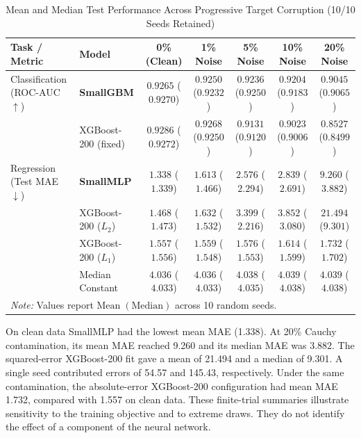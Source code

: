 \documentclass[journal]{IEEEtran}
\begin{document}
\begin{table}[!t]
\centering
\caption{Mean and Median Test Performance Across Progressive Target Corruption (10/10 Seeds Retained)}
\label{tab:noise_sweep}
\footnotesize
\begin{tabular}{llccccc}
\toprule
\textbf{Task / Metric} & \textbf{Model} & \textbf{0\% (Clean)} & \textbf{1\% Noise} & \textbf{5\% Noise} & \textbf{10\% Noise} & \textbf{20\% Noise} \\
\midrule
Classification (ROC-AUC $\uparrow$) & \textbf{SmallGBM} & $0.9265$ ($0.9270$) & $0.9250$ ($0.9232$) & $\mathbf{0.9236}$ ($\mathbf{0.9250}$) & $\mathbf{0.9204}$ ($\mathbf{0.9183}$) & $\mathbf{0.9045}$ ($\mathbf{0.9065}$) \\
 & XGBoost-200 (fixed) & $\mathbf{0.9286}$ ($\mathbf{0.9272}$) & $\mathbf{0.9268}$ ($\mathbf{0.9250}$) & $0.9131$ ($0.9120$) & $0.9023$ ($0.9006$) & $0.8527$ ($0.8499$) \\
\midrule
Regression (Test MAE $\downarrow$) & \textbf{SmallMLP} & $\mathbf{1.338}$ ($\mathbf{1.339}$) & $1.613$ ($1.466$) & $2.576$ ($2.294$) & $2.839$ ($2.691$) & $9.260$ ($3.882$) \\
 & XGBoost-200 ($L_2$) & $1.468$ ($1.473$) & $1.632$ ($1.532$) & $3.399$ ($2.216$) & $3.852$ ($3.080$) & $21.494$ ($9.301$) \\
 & XGBoost-200 ($L_1$) & $1.557$ ($1.556$) & $\mathbf{1.559}$ ($1.548$) & $\mathbf{1.576}$ ($\mathbf{1.553}$) & $\mathbf{1.614}$ ($\mathbf{1.599}$) & $\mathbf{1.732}$ ($\mathbf{1.702}$) \\
 & Median Constant & $4.036$ ($4.033$) & $4.036$ ($4.033$) & $4.038$ ($4.035$) & $4.039$ ($4.038$) & $4.039$ ($4.038$) \\
\bottomrule
\multicolumn{7}{l}{\footnotesize \textit{Note:} Values report $\text{Mean} \; (\text{Median})$ across 10 random seeds.}
\end{tabular}
\end{table}

On clean data SmallMLP had the lowest mean MAE (1.338). At 20\% Cauchy contamination, its mean MAE reached 9.260 and its median MAE was 3.882. The squared-error XGBoost-200 fit gave a mean of 21.494 and a median of 9.301. A single seed contributed errors of 54.57 and 145.43, respectively. Under the same contamination, the absolute-error XGBoost-200 configuration had mean MAE 1.732, compared with 1.557 on clean data. These finite-trial summaries illustrate sensitivity to the training objective and to extreme draws. They do not identify the effect of a component of the neural network.
\end{document}
